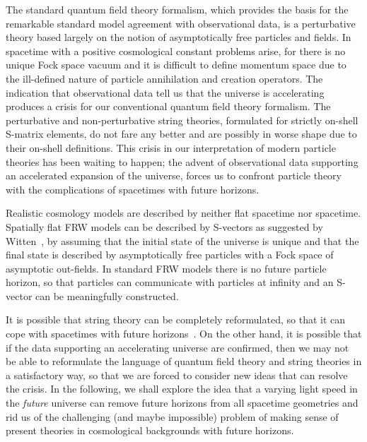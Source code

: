 \documentclass[a4paper,12pt]{article}
\begin{document}
The standard quantum field theory formalism, which provides the basis for
the remarkable standard model agreement with observational data, is a
perturbative theory based largely on the notion of asymptotically free
particles and fields. In \coordHE{} spacetime with a positive cosmological
constant problems arise, for there is no unique Fock space vacuum and it is
difficult to define momentum space due to the ill-defined nature of
particle annihilation and creation operators. The indication that
observational data tell us that the universe is accelerating produces a
crisis for our conventional quantum field theory formalism. The
perturbative and non-perturbative string theories, formulated for strictly
on-shell S-matrix elements, do not fare any better and are possibly in
worse shape due to their on-shell definitions. This crisis in our
interpretation of modern particle theories has been waiting to happen; the
advent of observational data supporting an accelerated expansion of the
universe, forces us to confront particle theory with the complications of
spacetimes with future horizons.

Realistic cosmology models are described by neither flat
spacetime nor \coordHE{} spacetime. Spatially flat FRW models can be described
by S-vectors as suggested by Witten~\cite{Witten}, by assuming that the
initial state of the universe is unique and that the final state is
described by asymptotically free particles with a Fock space of asymptotic
out-fields. In standard FRW models there is no future particle horizon, so
that particles can communicate with particles at infinity and an S-vector
can be meaningfully constructed.

It is possible that string theory can be completely reformulated, so that
it can cope with spacetimes with future horizons~\cite{Banks}. On the other
hand, it is possible that if the data supporting an accelerating universe
are confirmed, then we may not be able to reformulate the language of
quantum field theory and string theories in a satisfactory way, so that we
are forced to consider new ideas that can resolve the crisis. In the
following, we shall explore the idea that a varying light speed in the
{\it future} universe can remove future horizons from all spacetime
geometries and rid us of the challenging (and maybe impossible) problem
of making sense of present theories in cosmological backgrounds with
future horizons.
\end{document}

